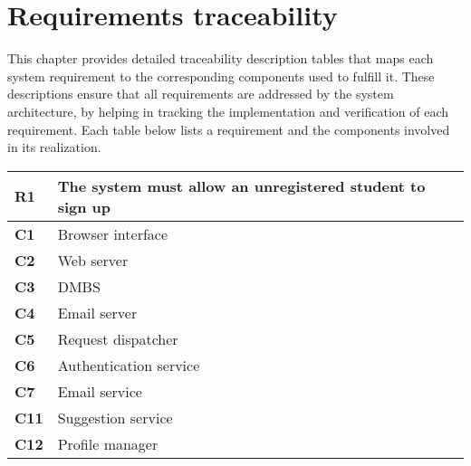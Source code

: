 \chapter{Requirements traceability}

This chapter provides detailed traceability description tables that maps each system requirement to the corresponding components used to fulfill it.
These descriptions ensure that all requirements are addressed by the system architecture, by helping in tracking the implementation and verification of each requirement.
Each table below lists a requirement and the components involved in its realization.

\begin{table}[H]
    \centering
    \begin{tabular}{|l|m{10cm}|}
        \hline \textbf{R1} & The system must allow an unregistered student to sign up \\
        \hline \textbf{C1} & Browser interface \\
        \hline \textbf{C2} & Web server \\
        \hline \textbf{C3} & DMBS \\
        \hline \textbf{C4} & Email server \\
        \hline \textbf{C5} & Request dispatcher \\
        \hline \textbf{C6} & Authentication service \\
        \hline \textbf{C7} & Email service \\
        \hline \textbf{C11} & Suggestion service \\
        \hline \textbf{C12} & Profile manager \\
        \hline
    \end{tabular}
\end{table}


